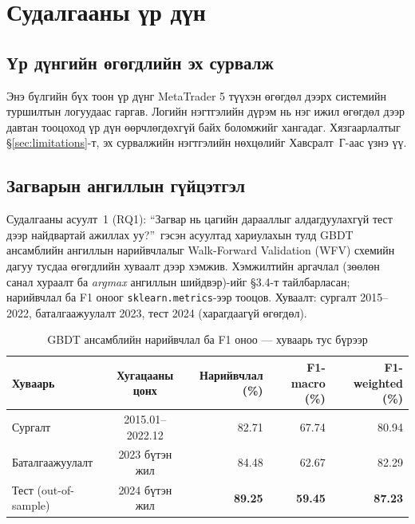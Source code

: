 \chapter{Судалгааны үр дүн}
\label{ch:results}

\sloppy
{}

\section{Үр дүнгийн өгөгдлийн эх сурвалж}

Энэ бүлгийн бүх тоон үр дүнг MetaTrader 5 түүхэн өгөгдөл дээрх системийн туршилтын логуудаас гаргав. Логийн нэгтгэлийн дүрэм нь нэг ижил өгөгдөл дээр давтан тооцоход үр дүн өөрчлөгдөхгүй байх боломжийг хангадаг. Хязгаарлалтыг §\ref{sec:limitations}-т, эх сурвалжийн нэгтгэлийн нөхцөлийг Хавсралт~Г-аас үзнэ үү.

\section{Загварын ангиллын гүйцэтгэл}
\label{sec:model_classification_performance}

Судалгааны асуулт~1 (RQ1): ``Загвар нь цагийн дарааллыг алдагдуулахгүй тест дээр найдвартай ажиллах уу?''~гэсэн асуултад хариулахын тулд GBDT ансамблийн ангиллын нарийвчлалыг Walk-Forward Validation (WFV) схемийн дагуу тусдаа өгөгдлийн хуваалт дээр хэмжив. Хэмжилтийн аргачлал (зөөлөн санал хураалт ба \textit{argmax} ангиллын шийдвэр)-ийг §3.4-т тайлбарласан; нарийвчлал ба F1 оноог \texttt{sklearn.metrics}-ээр тооцов. Хуваалт: сургалт 2015--2022, баталгаажуулалт 2023, тест 2024 (харагдаагүй өгөгдөл).

\begin{table}[H]
\centering
\caption{GBDT ансамблийн нарийвчлал ба F1 оноо — хуваарь тус бүрээр}
\label{tab:model_accuracy}
\renewcommand{\arraystretch}{1.20}
\setlength{\tabcolsep}{4pt}
\begin{tabular}{|l|c|r|r|r|}
\hline
\textbf{Хуваарь} & \textbf{Хугацааны цонх} & \textbf{Нарийвчлал (\%)} & \textbf{F1-macro (\%)} & \textbf{F1-weighted (\%)} \\ \hline
Сургалт           & 2015.01--2022.12 & 82.71 & 67.74 & 80.94 \\ \hline
Баталгаажуулалт   & 2023 бүтэн жил   & 84.48 & 62.67 & 82.29 \\ \hline
Тест (out-of-sample) & 2024 бүтэн жил & \textbf{89.25} & \textbf{59.45} & \textbf{87.23} \\ \hline
\end{tabular}
\end{table}

